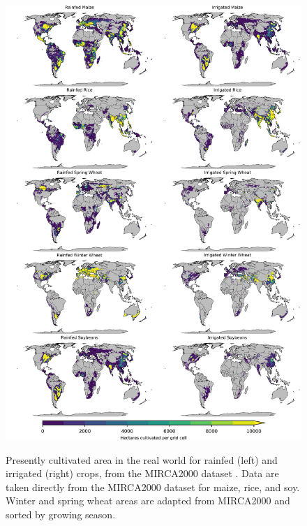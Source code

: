 \documentclass[12pt]{article}
\begin{document}
\clearpage
\begin{figure}[h!]
    \centering
    \includegraphics[width=14cm]{cult_area.png}\\
    \caption{
    Presently cultivated area in the real world for rainfed (left) and irrigated (right) crops, from the MIRCA2000 dataset \parencite{Portmann2010}. 
    Data are taken directly from the MIRCA2000 dataset  for maize, rice, and soy. 
    Winter and spring wheat areas are adapted from MIRCA2000 and sorted by growing season.
    }
    \label{fig:irrarea}
\end{figure}

\clearpage
\end{document}
